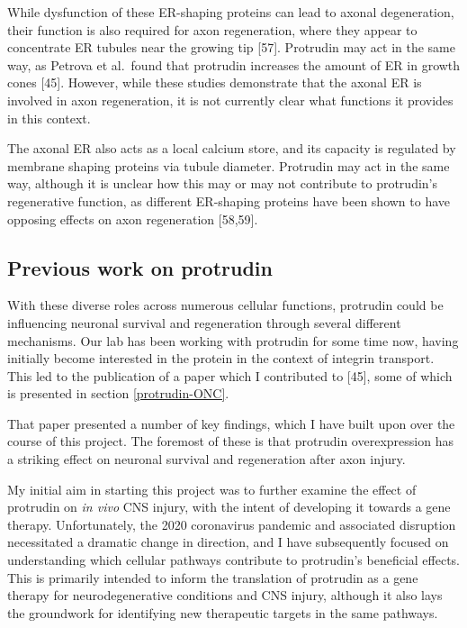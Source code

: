 \documentclass[
  12pt,
  a4paper,
]{book}
\begin{document}
While dysfunction of these ER-shaping proteins can lead to axonal degeneration, their function is also required for axon regeneration, where they appear to concentrate ER tubules near the growing tip {[}57{]}. Protrudin may act in the same way, as Petrova et al.~found that protrudin increases the amount of ER in growth cones {[}45{]}. However, while these studies demonstrate that the axonal ER is involved in axon regeneration, it is not currently clear what functions it provides in this context.

The axonal ER also acts as a local calcium store, and its capacity is regulated by membrane shaping proteins via tubule diameter. Protrudin may act in the same way, although it is unclear how this may or may not contribute to protrudin's regenerative function, as different ER-shaping proteins have been shown to have opposing effects on axon regeneration {[}58,59{]}.

\hypertarget{previous-work-on-protrudin}{%
\subsection{Previous work on protrudin}\label{previous-work-on-protrudin}}

With these diverse roles across numerous cellular functions, protrudin could be influencing neuronal survival and regeneration through several different mechanisms. Our lab has been working with protrudin for some time now, having initially become interested in the protein in the context of integrin transport. This led to the publication of a paper which I contributed to {[}45{]}, some of which is presented in section \ref{protrudin-ONC}.

That paper presented a number of key findings, which I have built upon over the course of this project. The foremost of these is that protrudin overexpression has a striking effect on neuronal survival and regeneration after axon injury.

My initial aim in starting this project was to further examine the effect of protrudin on \emph{in vivo} CNS injury, with the intent of developing it towards a gene therapy. Unfortunately, the 2020 coronavirus pandemic and associated disruption necessitated a dramatic change in direction, and I have subsequently focused on understanding which cellular pathways contribute to protrudin's beneficial effects. This is primarily intended to inform the translation of protrudin as a gene therapy for neurodegenerative conditions and CNS injury, although it also lays the groundwork for identifying new therapeutic targets in the same pathways.
\end{document}
